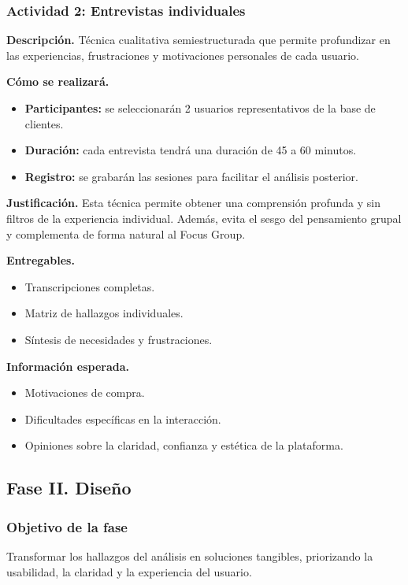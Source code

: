 \documentclass[12pt,letterpaper]{article}
\begin{document}
\subsubsection{Actividad 2: Entrevistas individuales}

\textbf{Descripción.} Técnica cualitativa semiestructurada que permite profundizar en las experiencias, frustraciones y motivaciones personales de cada usuario.

\textbf{Cómo se realizará.}
\begin{itemize}
    \item \textbf{Participantes:} se seleccionarán 2 usuarios representativos de la base de clientes.
    \item \textbf{Duración:} cada entrevista tendrá una duración de 45 a 60 minutos.
    \item \textbf{Registro:} se grabarán las sesiones para facilitar el análisis posterior.
\end{itemize}

\textbf{Justificación.} Esta técnica permite obtener una comprensión profunda y sin filtros de la experiencia individual. Además, evita el sesgo del pensamiento grupal y complementa de forma natural al Focus Group.

\textbf{Entregables.}
\begin{itemize}
    \item Transcripciones completas.
    \item Matriz de hallazgos individuales.
    \item Síntesis de necesidades y frustraciones.
\end{itemize}

\textbf{Información esperada.}
\begin{itemize}
    \item Motivaciones de compra.
    \item Dificultades específicas en la interacción.
    \item Opiniones sobre la claridad, confianza y estética de la plataforma.
\end{itemize}

\subsection{Fase II. Diseño}

\subsubsection{Objetivo de la fase}
Transformar los hallazgos del análisis en soluciones tangibles, priorizando la usabilidad, la claridad y la experiencia del usuario.
\end{document}
